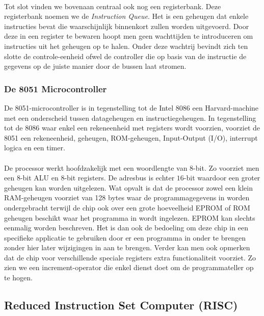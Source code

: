 \paragraph{}
Tot slot vinden we bovenaan centraal ook nog een registerbank. Deze registerbank noemen we de \emph{Instruction Queue}. Het is een geheugen dat enkele instructies bevat die waarschijnlijk binnenkort zullen worden uitgevoerd. Door deze in een register te bewaren hoopt men geen wachttijden te introduceren om instructies uit het geheugen op te halen. Onder deze wachtrij bevindt zich ten slotte de controle-eenheid ofwel de controller die op basis van de instructie de gegevens op de juiste manier door de bussen laat stromen.
\subsubsection{De 8051 Microcontroller}
De 8051-microcontroller is in tegenstelling tot de Intel 8086 een Harvard-machine met een onderscheid tussen datageheugen en instructiegeheugen. In tegenstelling tot de 8086 waar enkel een rekeneenheid met registers wordt voorzien, voorziet de 8051 een rekeneenheid, geheugen, ROM-geheugen, Input-Output (I/O), interrupt logica en een timer.
\paragraph{}
De processor werkt hoofdzakelijk met een woordlengte van $8$-bit. Zo voorziet men een $8$-bit ALU en $8$-bit registers. De adresbus is echter $16$-bit waardoor een groter geheugen kan worden uitgelezen. Wat opvalt is dat de processor zowel een klein RAM-geheugen voorziet van 128 bytes waar de programmagegevens in worden ondergebracht terwijl de chip ook over een grote hoeveelheid EPROM of ROM geheugen beschikt waar het programma in wordt ingelezen. EPROM kan slechts eenmalig worden beschreven. Het is dan ook de bedoeling om deze chip in een specifieke applicatie te gebruiken door er een programma in onder te brengen zonder hier later wijzigingen in aan te brengen. Verder kan men ook opmerken dat de chip voor verschillende speciale registers extra functionaliteit voorziet. Zo zien we een increment-operator die enkel dienst doet om de programmateller op te hogen.
\subsection{Reduced Instruction Set Computer (RISC)}
